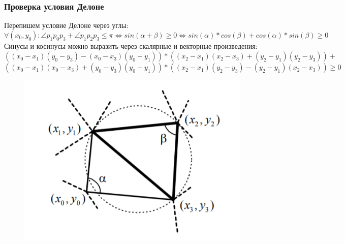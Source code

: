 \documentclass[notheorems,aspectratio=169]{beamer}
\begin{document}
\begin{frame}\frametitle{Проверка условия Делоне}
	Перепишем условие Делоне через углы:
	$$\forall (x_0, y_0): \angle p_1p_0p_3 + \angle p_1p_2p_3 \leq \pi
	\Leftrightarrow sin(\alpha+\beta) \geq 0 \Leftrightarrow 
	sin(\alpha)*cos(\beta)+cos(\alpha)*sin(\beta)\geq 0$$
	Синусы и косинусы можно выразить через скалярные и векторные произведения:
	$((x_0 - x_1)(y_0-y_3)-(x_0-x_3)(y_0-y_1))*
	((x_2 - x_1)(x_2-x_3)+(y_2-y_1)(y_2-y_3)) +$   
	$((x_0 - x_1)(x_0-x_3)+(y_0-y_3)(y_0-y_1))*
	((x_2 - x_1)(y_2-y_3)-(y_2-y_1)(x_2-x_3))\geq 0$
	\begin{figure}
		\includegraphics[height=0.3\textheight, keepaspectratio]{angles1.png}
	\end{figure}
\end{frame}
\end{document}
